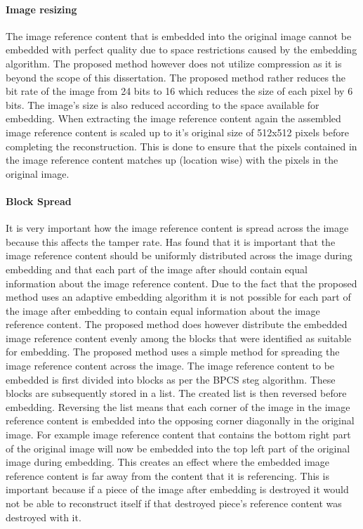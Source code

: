 \documentclass[12pt]{article}
\begin{document}
\paragraph{Image resizing}
\label{ImageCompression}
The image reference content that is embedded into the original image cannot be embedded with perfect quality due to space restrictions caused by the embedding algorithm. 
The proposed method however does not utilize compression as it is beyond the scope of this dissertation.
The proposed method rather reduces the bit rate of the image from 24 bits to 16 which reduces the size of each pixel by 6 bits.
The image's size is also reduced according to the space available for embedding.
When extracting the image reference content again the assembled image reference content is scaled up to it's original size of 512x512 pixels before completing the reconstruction.
This is done to ensure that the pixels contained in the image reference content matches up (location wise) with the pixels in the original image.

\paragraph{Block Spread}
It is very important how the image reference content is spread across the image because this affects the tamper rate.
\cite{korus2013efficient} Has found that it is important that the image reference content should be uniformly distributed across the image during embedding and that each part of the image after should contain equal information about the image reference content.
Due to the fact that the proposed method uses an adaptive embedding algorithm it is not possible for each part of the image after embedding to contain equal information about the image reference content.
The proposed method does however distribute the embedded image reference content evenly among the blocks that were identified as suitable for embedding.
The proposed method uses a simple method for spreading the image reference content across the image.
The image reference content to be embedded is first divided into blocks as per the BPCS steg algorithm.
These blocks are subsequently stored in a list. 
The created list is then reversed before embedding.
Reversing the list means that each corner of the image in the image reference content is embedded into the opposing corner diagonally in the original image. For example image reference content that contains the bottom right part of the original image will now be embedded into the top left part of the original image during embedding. 
This creates an effect where the embedded image reference content is far away from the content that it is referencing.
This is important because if a piece of the image after embedding is destroyed it would not be able to reconstruct itself if that destroyed piece's reference content was destroyed with it.
\end{document}
